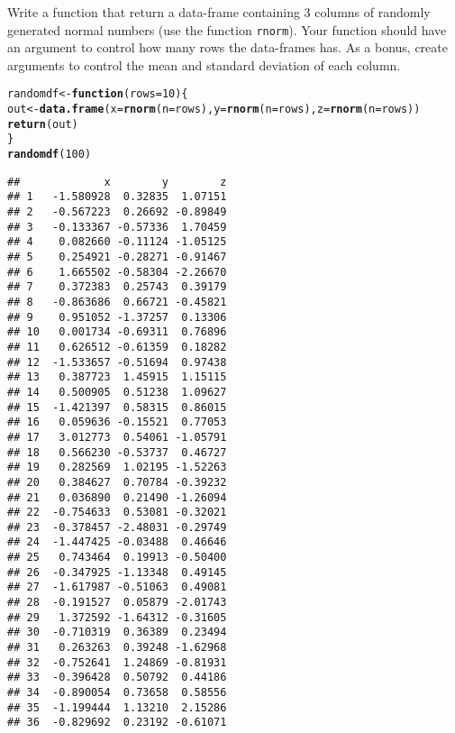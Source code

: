 \documentclass[12pt,a4paper]{scrartcl}\usepackage[]{graphicx}\usepackage[]{color}
\makeatletter
\newcommand{\hlnum}[1]{\textcolor[rgb]{0.686,0.059,0.569}{#1}}%
\newcommand{\hlstd}[1]{\textcolor[rgb]{0.345,0.345,0.345}{#1}}%
\newcommand{\hlkwa}[1]{\textcolor[rgb]{0.161,0.373,0.58}{\textbf{#1}}}%
\newcommand{\hlkwb}[1]{\textcolor[rgb]{0.69,0.353,0.396}{#1}}%
\newcommand{\hlkwc}[1]{\textcolor[rgb]{0.333,0.667,0.333}{#1}}%
\newcommand{\hlkwd}[1]{\textcolor[rgb]{0.737,0.353,0.396}{\textbf{#1}}}%
\newenvironment{kframe}{%
 \def\at@end@of@kframe{}%
 \ifinner\ifhmode%
  \def\at@end@of@kframe{\end{minipage}}%
  \begin{minipage}{\columnwidth}%
 \fi\fi%
 \def\FrameCommand##1{\hskip\@totalleftmargin \hskip-\fboxsep
 \colorbox{shadecolor}{##1}\hskip-\fboxsep
     \hskip-\linewidth \hskip-\@totalleftmargin \hskip\columnwidth}%
 \MakeFramed {\advance\hsize-\width
   \@totalleftmargin\z@ \linewidth\hsize
   \@setminipage}}%
 {\par\unskip\endMakeFramed%
 \at@end@of@kframe}
\newenvironment{knitrout}{}{} %
\makeatother
\begin{document}
\begin{Exercise}[difficulty=2, title={Write a data-frame of random values in output}]
Write a function that return a data-frame containing 3 columns of randomly generated normal numbers (use the function \texttt{rnorm}). Your function should have an argument to control how many rows the data-frames has. As a bonus, create arguments to control the mean and standard deviation of each column.
\end{Exercise}
\begin{Answer}
\begin{knitrout}
\color{fgcolor}\begin{kframe}
\begin{alltt}
\hlstd{randomdf} \hlkwb{<-} \hlkwa{function}\hlstd{(}\hlkwc{rows}\hlstd{=}\hlnum{10}\hlstd{)\{}
  \hlstd{out} \hlkwb{<-} \hlkwd{data.frame}\hlstd{(}\hlkwc{x} \hlstd{=} \hlkwd{rnorm}\hlstd{(}\hlkwc{n}\hlstd{=rows),} \hlkwc{y}\hlstd{=} \hlkwd{rnorm}\hlstd{(}\hlkwc{n}\hlstd{=rows),} \hlkwc{z} \hlstd{=} \hlkwd{rnorm}\hlstd{(}\hlkwc{n}\hlstd{=rows))}
  \hlkwd{return}\hlstd{(out)}
\hlstd{\}}
\hlkwd{randomdf}\hlstd{(}\hlnum{100}\hlstd{)}
\end{alltt}
\begin{verbatim}
##             x        y        z
## 1   -1.580928  0.32835  1.07151
## 2   -0.567223  0.26692 -0.89849
## 3   -0.133367 -0.57336  1.70459
## 4    0.082660 -0.11124 -1.05125
## 5    0.254921 -0.28271 -0.91467
## 6    1.665502 -0.58304 -2.26670
## 7    0.372383  0.25743  0.39179
## 8   -0.863686  0.66721 -0.45821
## 9    0.951052 -1.37257  0.13306
## 10   0.001734 -0.69311  0.76896
## 11   0.626512 -0.61359  0.18282
## 12  -1.533657 -0.51694  0.97438
## 13   0.387723  1.45915  1.15115
## 14   0.500905  0.51238  1.09627
## 15  -1.421397  0.58315  0.86015
## 16   0.059636 -0.15521  0.77053
## 17   3.012773  0.54061 -1.05791
## 18   0.566230 -0.53737  0.46727
## 19   0.282569  1.02195 -1.52263
## 20   0.384627  0.70784 -0.39232
## 21   0.036890  0.21490 -1.26094
## 22  -0.754633  0.53081 -0.32021
## 23  -0.378457 -2.48031 -0.29749
## 24  -1.447425 -0.03488  0.46646
## 25   0.743464  0.19913 -0.50400
## 26  -0.347925 -1.13348  0.49145
## 27  -1.617987 -0.51063  0.49081
## 28  -0.191527  0.05879 -2.01743
## 29   1.372592 -1.64312 -0.31605
## 30  -0.710319  0.36389  0.23494
## 31   0.263263  0.39248 -1.62968
## 32  -0.752641  1.24869 -0.81931
## 33  -0.396428  0.50792  0.44186
## 34  -0.890054  0.73658  0.58556
## 35  -1.199444  1.13210  2.15286
## 36  -0.829692  0.23192 -0.61071

\end{verbatim}
\end{kframe}
\end{knitrout}
\end{Answer}
\end{document}
